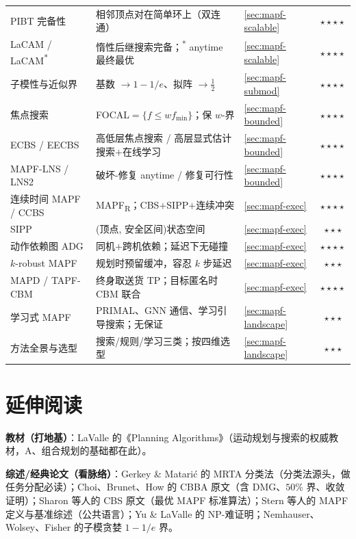 \begin{table}[H]
\begin{tabular}{lllc}
PIBT 完备性 & 相邻顶点对在简单环上（双连通） & \cref{sec:mapf-scalable} & $\star\star\star\star$ \\
LaCAM / LaCAM\textsuperscript{*} & 惰性后继搜索完备；\textsuperscript{*} anytime 最终最优 & \cref{sec:mapf-scalable} & $\star\star\star\star$ \\
子模性与近似界 & 基数 $\to 1-1/e$、拟阵 $\to\tfrac12$ & \cref{sec:mapf-submod} & $\star\star\star\star$ \\
焦点搜索 & FOCAL$=\{f\le w f_{\min}\}$；保 $w$-界 & \cref{sec:mapf-bounded} & $\star\star\star\star$ \\
ECBS / EECBS & 高低层焦点搜索 / 高层显式估计搜索$+$在线学习 & \cref{sec:mapf-bounded} & $\star\star\star\star$ \\
MAPF-LNS / LNS2 & 破坏-修复 anytime / 修复可行性 & \cref{sec:mapf-bounded} & $\star\star\star\star$ \\
连续时间 MAPF / CCBS & MAPF\textsubscript{R}；CBS$+$SIPP$+$连续冲突 & \cref{sec:mapf-exec} & $\star\star\star\star$ \\
SIPP & (顶点, 安全区间)状态空间 & \cref{sec:mapf-exec} & $\star\star\star$ \\
动作依赖图 ADG & 同机$+$跨机依赖；延迟下无碰撞 & \cref{sec:mapf-exec} & $\star\star\star\star$ \\
$k$-robust MAPF & 规划时预留缓冲，容忍 $k$ 步延迟 & \cref{sec:mapf-exec} & $\star\star\star$ \\
MAPD / TAPF-CBM & 终身取送货 TP；目标匿名时 CBM 联合 & \cref{sec:mapf-exec} & $\star\star\star\star$ \\
学习式 MAPF & PRIMAL、GNN 通信、学习引导搜索；无保证 & \cref{sec:mapf-landscape} & $\star\star\star$ \\
方法全景与选型 & 搜索/规则/学习三类；按四维选型 & \cref{sec:mapf-landscape} & $\star\star\star$ \\
\bottomrule
\end{tabular}
\end{table}

\section{延伸阅读}
\label{sec:mapf-further}

\textbf{教材（打地基）}：LaValle 的《Planning Algorithms》\cite{lavalle2006planning}（运动规划与搜索的权威教材，A\*、组合规划的基础都在此）。

\textbf{综述/经典论文（看脉络）}：Gerkey \& Matari\'c 的 MRTA 分类法\cite{gerkey2004taxonomy}（分类法源头，做任务分配必读）；Choi、Brunet、How 的 CBBA 原文\cite{choi2009cbba}（含 DMG、$50\%$ 界、收敛证明）；Sharon 等人的 CBS 原文\cite{sharon2015cbs}（最优 MAPF 标准算法）；Stern 等人的 MAPF 定义与基准综述\cite{stern2019mapf}（公共语言）；Yu \& LaValle 的 NP-难证明\cite{yu2013structure}；Nemhauser、Wolsey、Fisher 的子模贪婪 $1-1/e$ 界\cite{nemhauser1978analysis}。

